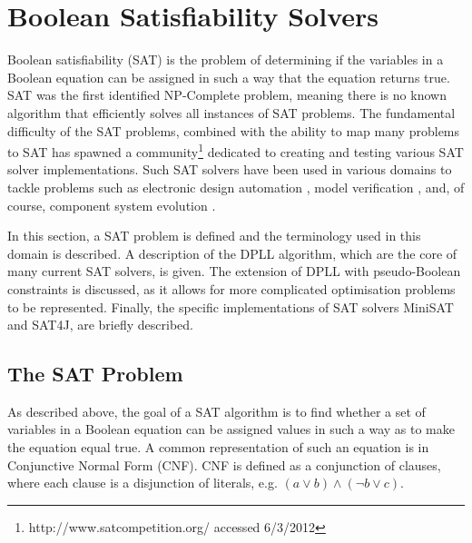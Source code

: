 \section{Boolean Satisfiability Solvers}
\label{impl.SAT}
Boolean satisfiability (SAT) is the problem of determining if the variables in a Boolean equation can be assigned in such a way that the equation returns true.
SAT was the first identified NP-Complete problem, meaning there is no known algorithm that efficiently solves all instances of SAT problems.
The fundamental difficulty of the SAT problems, 
combined with the ability to map many problems to SAT has spawned a community\footnote{http://www.satcompetition.org/ accessed 6/3/2012} 
dedicated to creating and testing various SAT solver implementations. 
Such SAT solvers have been used in various domains to tackle problems such as electronic design automation \citep{Marques-Silva2000}, 
model verification \citep{dennis2006}, and, of course, component system evolution \citep{leBerre2010}.

In this section, a SAT problem is defined and the terminology used in this domain is described. 
A description of the DPLL algorithm, which are the core of many current SAT solvers, is given.
The extension of DPLL with pseudo-Boolean constraints is discussed, as it allows for more complicated optimisation problems to be represented.
Finally, the specific implementations of SAT solvers MiniSAT \citep{een2003} and SAT4J\citep{le2010sat4j}, are briefly described.

\subsection{The SAT Problem}
As described above, the goal of a SAT algorithm is to find whether a set of variables in a Boolean equation can be assigned values in such a way as to make the equation equal true.
A common representation of such an equation is in Conjunctive Normal Form (CNF).
CNF is defined as a conjunction of clauses, 
where each clause is a disjunction of literals, e.g. $(a \vee b) \wedge (\neg b \vee c)$.

